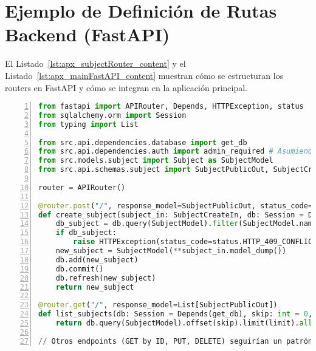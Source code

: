 \section{Ejemplo de Definición de Rutas Backend (FastAPI)}
\label{apx_ssec:fastapi_router_example}
El Listado~\ref{lst:apx_subjectRouter_content} y el Listado~\ref{lst:apx_mainFastAPI_content} muestran cómo se estructuran los routers en FastAPI y cómo se integran en la aplicación principal.

\begin{lstlisting}[language=python, basicstyle=\footnotesize\ttfamily, caption={Ejemplo de Router FastAPI para la entidad Asignaturas (\texttt{subjects_router.py} - extracto).}, label={lst:apx_subjectRouter_content}, frame=tb, numbers=left, numberstyle=\tiny\color{gray}]
from fastapi import APIRouter, Depends, HTTPException, status
from sqlalchemy.orm import Session
from typing import List

from src.api.dependencies.database import get_db
from src.api.dependencies.auth import admin_required # Asumiendo dependencia de admin
from src.models.subject import Subject as SubjectModel
from src.api.schemas.subject import SubjectPublicOut, SubjectCreateIn, SubjectUpdateIn # Schemas Pydantic

router = APIRouter()

@router.post("/", response_model=SubjectPublicOut, status_code=status.HTTP_201_CREATED, dependencies=[Depends(admin_required)])
def create_subject(subject_in: SubjectCreateIn, db: Session = Depends(get_db)):
    db_subject = db.query(SubjectModel).filter(SubjectModel.name == subject_in.name).first()
    if db_subject:
        raise HTTPException(status_code=status.HTTP_409_CONFLICT, detail="Subject name already exists")
    new_subject = SubjectModel(**subject_in.model_dump())
    db.add(new_subject)
    db.commit()
    db.refresh(new_subject)
    return new_subject

@router.get("/", response_model=List[SubjectPublicOut])
def list_subjects(db: Session = Depends(get_db), skip: int = 0, limit: int = 100):
    return db.query(SubjectModel).offset(skip).limit(limit).all()

// Otros endpoints (GET by ID, PUT, DELETE) seguirían un patrón similar...
\end{lstlisting}

